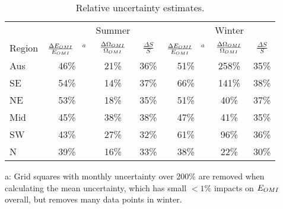   \begin{table}\begin{threeparttable}
      \caption{Relative uncertainty estimates.}
      \begin{tabular}{ l | c  c  c | c c c} 
        \toprule
        & & Summer & & & Winter & \\
        Region & $\frac{\Delta E_{OMI}}{E_{OMI}}$ ~$^a$ & $\frac{\Delta \Omega_{OMI}}{\Omega_{OMI}}$ & $\frac{\Delta S}{S}$ 
          & $\frac{\Delta E_{OMI}}{E_{OMI}}$ ~$^a$ & $\frac{\Delta \Omega_{OMI}}{\Omega_{OMI}}$ & $\frac{\Delta S}{S}$ \\
        \midrule
          Aus &   46\% &   21\% &   36\% &   51\% &  258\% &   35\% \\
          SE &   54\% &   14\% &   37\% &   66\% &  141\% &   38\% \\
          NE &   53\% &   18\% &   35\% &   51\% &   40\% &   37\% \\
          Mid &   45\% &   38\% &   38\% &   47\% &   41\% &   35\% \\
          SW &   43\% &   27\% &   32\% &   61\% &   96\% &   36\% \\
          N &   39\% &   16\% &   33\% &   38\% &   22\% &   30\% \\
        \bottomrule
      \end{tabular}
      \begin{tablenotes} 
        \item a: Grid squares with monthly uncertainty over 200\% are removed when calculating the mean uncertainty, which has small $<1\%$ impacts on $E_{OMI}$ overall, but removes many data points in winter. 
      \end{tablenotes}
      \label{BioIsop:uncertainty:tab_uncertainties}
    \end{threeparttable}\end{table}
    

%    
    
